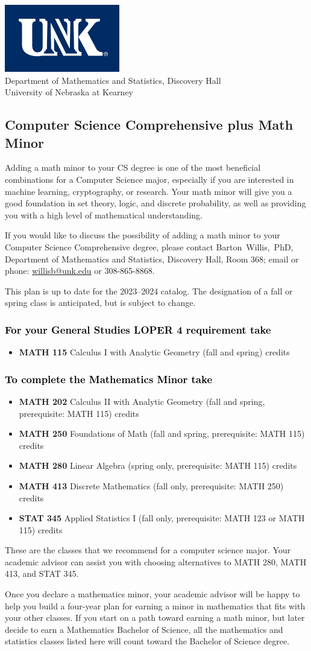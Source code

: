 \documentclass[10pt]{article}
\makeatletter
\newcommand{\calcone}{\textbf{MATH 115} Calculus I with Analytic Geometry (fall and spring) \dotfill 5 credits}
\newcommand{\calctwo}{\textbf{MATH 202} Calculus II with Analytic Geometry (fall and spring, prerequisite: MATH 115) \dotfill 5 credits }
\newcommand{\foundations}{\textbf{MATH 250} Foundations of Math (fall and spring, prerequisite: MATH 115)  \dotfill 3 credits}
\newcommand{\linear}{\textbf{MATH 280} Linear Algebra (spring only, prerequisite: MATH 115) \dotfill 3 credits}
\newcommand{\linearshort}{MATH 280}
\newcommand{\discrete}{\textbf{MATH 413} Discrete Mathematics  (fall only, prerequisite: MATH 250)\dotfill 3 credits}
\newcommand{\discreteshort}{MATH 413}
\newcommand{\appliedstat}{\textbf{STAT 345} Applied Statistics I (fall only, prerequisite: MATH 123 or MATH 115) \dotfill 3 credits}
\newcommand{\appliedstatshort}{STAT 345}
\newcommand{\contactbw}{\mbox{Barton Willis, PhD}, Department of Mathematics and Statistics,  Discovery Hall, Room 368;
email or phone: \href{mailto:willisb@unk.edu}{willisb@unk.edu} or 308-865-8868.}
\newcommand{\forinfo}[2]{If you would like to discuss the possibility of adding a math {#1} to your {#2}, please contact \contactbw}
\newcommand{\catalog}{2023--2024 }
\newcommand{\LOPER}{LOPER\xspace}
\newcommand{\uptodate}{This plan is up to date for  the \catalog catalog. The designation of a fall or spring class is 
anticipated, but  is subject to change.}
\newcommand{\myheading}{
\begin{flushleft}
\includegraphics[scale=0.35]{unk-logo}\\
\setcounter{footnote}{0}
\vspace{0.25in}
 \textcolor{unkblue}{Department of Mathematics and Statistics, Discovery Hall} \\
  \textcolor{unkblue}{University of Nebraska at Kearney}
\end{flushleft}}
\makeatother
\begin{document}
\myheading


\subsection*{\textbf{\textcolor{unkblue}{Computer Science Comprehensive plus Math Minor}}}

Adding a math minor to your CS degree is one of the most beneficial 
combinations for a Computer Science major, especially if you are interested 
in machine learning, cryptography, or research. Your math minor will 
give you a good foundation in set theory, logic, and discrete probability, as 
well as providing you with a high level of mathematical understanding.


\forinfo{minor}{Computer Science Comprehensive degree}

\uptodate

\vspace{-0.1in}

\subsubsection*{\textcolor{black}{For your General Studies \LOPER 4 requirement take}}
\begin{itemize}
\item  \calcone
\end{itemize}

\subsubsection*{\textcolor{black}{To complete the Mathematics Minor take}}
\begin{itemize}
\item \calctwo
\item \foundations
\item \linear
\item \discrete
\item \appliedstat
\end{itemize}
\vspace{0.1in}
These are the classes that we recommend for a computer science major.
Your academic advisor can assist you with choosing alternatives 
to \linearshort, \discreteshort, and \appliedstatshort.

Once you declare a mathematics minor, your academic advisor will be happy to help you build a 
four-year plan for earning a minor in mathematics that fits with 
your other classes.  If you start on a path toward earning a math minor, but later decide to 
earn a  Mathematics Bachelor of 
Science, all the mathematics and statistics  classes listed here 
will count toward the Bachelor of Science degree.
\end{document}
